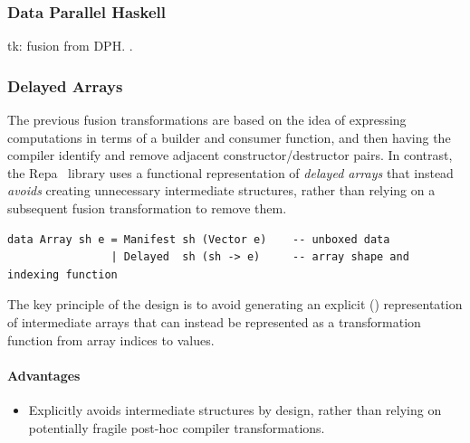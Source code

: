 \subsubsection{Data Parallel Haskell}
tk:  fusion from
DPH.
\citet{Chakravarty:2007tc,Jones:2008uu}.


\subsubsection{Delayed Arrays}

The previous fusion transformations are based on the idea of expressing
computations in terms of a builder and consumer function, and then having the
compiler identify and remove adjacent constructor/destructor pairs. In contrast,
the Repa~\cite{Keller:2010er} library uses a functional representation of
\emph{delayed arrays} that instead \emph{avoids}
creating unnecessary intermediate structures, rather than relying on a
subsequent fusion transformation to remove them.

\begin{lstlisting}[style=Haskell,numbers=none,caption={Repa-1 style array definition},label={lst:repa_arrays}]
data Array sh e = Manifest sh (Vector e)    -- unboxed data
                | Delayed  sh (sh -> e)     -- array shape and indexing function
\end{lstlisting}

The key principle of the design is to avoid generating an explicit
() representation of intermediate arrays that can instead be
represented as a transformation function from array indices to values.


\paragraph{Advantages}
\begin{itemize}
    \item Explicitly avoids intermediate structures by design, rather than
        relying on potentially fragile post-hoc compiler transformations.
\end{itemize}


